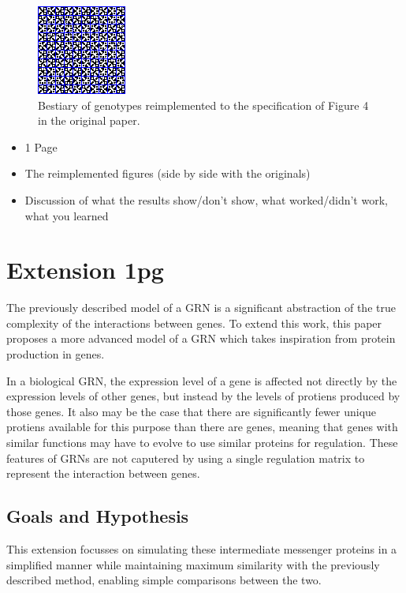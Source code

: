 \documentclass[twocolumn,a4paper]{article}
\begin{document}
    \begin{figure}[h]
        \centering
        \includegraphics[width=0.45\linewidth]{img/fig4b.png}
        \caption{Bestiary of genotypes reimplemented to the specification of Figure 4 in the original paper.}
    \end{figure}

    \begin{itemize}
        \item 1 Page
        \item The reimplemented figures (side by side with the originals)
        \item Discussion of what the results show/don't show, what worked/didn't work, what you learned
    \end{itemize}
    \section{Extension 1pg}
    The previously described model of a GRN is a significant abstraction of the true complexity of the interactions between genes. To extend this work, this paper proposes a more advanced model of a GRN which takes inspiration from protein production in genes.

    In a biological GRN, the expression level of a gene is affected not directly by the expression levels of other genes, but instead by the levels of protiens produced by those genes. It also may be the case that there are significantly fewer unique protiens available for this purpose than there are genes, meaning that genes with similar functions may have to evolve to use similar proteins for regulation. These features of GRNs are not caputered by using a single regulation matrix to represent the interaction between genes.

    \subsection{Goals and Hypothesis}
    This extension focusses on simulating these intermediate messenger proteins in a simplified manner while maintaining maximum similarity with the previously described method, enabling simple comparisons between the two.
\end{document}
